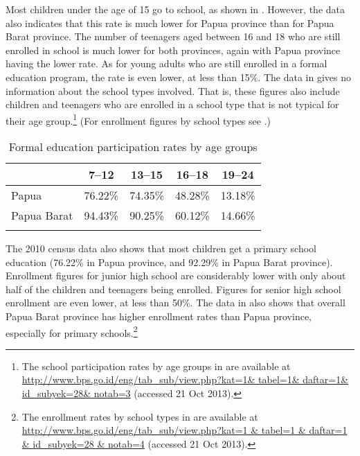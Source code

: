 {Most children under the age of 15 go to school, as shown in . However, the data also indicates that this rate is much lower for Papua province than for Papua Barat province. The number of teenagers aged between 16 and 18 who are still enrolled in school is much lower for both provinces, again with Papua province having the lower rate. As for young adults who are still enrolled in a formal education program, the rate is even lower, at less than 15\%. The data in  gives no information about the school types involved. That is, these figures also include children and teenagers who are enrolled in a school type that is not typical for their age group.\footnote{The school participation rates by age groups in  are available at \url{http://www.bps.go.id/eng/tab\_sub/view.php?kat=1\& tabel=1\& daftar=1\& id\_subyek=28\& notab=3} (accessed 21 Oct 2013).} (For enrollment figures by school types see  .)


\begin{table}
\caption{Formal education participation rates by age groups}\label{Table_1.11}


\begin{tabular}{l*{4}{r}}
\lsptoprule

    & \multicolumn{1}{c}{7--12 } & \multicolumn{1}{c}{13--15} & \multicolumn{1}{c}{16--18} &  \multicolumn{1}{c}{19--24}\\
 \midrule
Papua &  76.22\% &  74.35\% &  48.28\% &  13.18\%\\
Papua Barat &  94.43\% &  90.25\% &  60.12\% &  14.66\%\\
\lspbottomrule
\end{tabular}
\end{table}

The 2010 census data also shows that most children get a primary school education (76.22\% in Papua province, and 92.29\% in Papua Barat province). Enrollment figures for junior high school are considerably lower with only about half of the children and teenagers being enrolled. Figures for senior high school enrollment are even lower, at less than 50\%. The data in  also shows that overall Papua Barat province has higher enrollment rates than Papua province, especially for primary schools.\footnote{The enrollment rates by school types in  are available at \url{http://www.bps.go.id/eng/tab_sub/view.php?kat=1 & tabel=1 & daftar=1 & id_subyek=28 & notab=4} (accessed 21 Oct 2013).}


}
